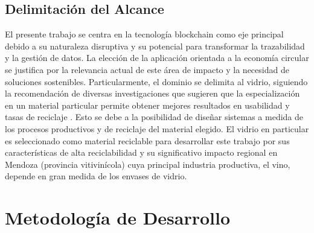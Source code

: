 \subsection{Delimitación del Alcance}

El presente trabajo se centra en la tecnología blockchain como eje principal debido a su naturaleza disruptiva y su potencial para transformar la trazabilidad y la gestión de datos.
La elección de la aplicación orientada a la economía circular se justifica por la relevancia actual de este área de impacto y la necesidad de soluciones sostenibles.
Particularmente, el dominio se delimita al vidrio, siguiendo la recomendación de diversas investigaciones que sugieren que la especialización en un material particular permite obtener mejores resultados en usabilidad y tasas de reciclaje \cite{pending}.
Esto se debe a la posibilidad de diseñar sistemas a medida de los procesos productivos y de reciclaje del material elegido.
El vidrio en particular es seleccionado como material reciclable para desarrollar este trabajo por sus características de alta reciclabilidad y su significativo impacto regional en Mendoza (provincia vitivinícola) cuya principal industria productiva, el vino, depende en gran medida de los envases de vidrio.

\section{Metodología de Desarrollo}
\label{sec:software-method}

